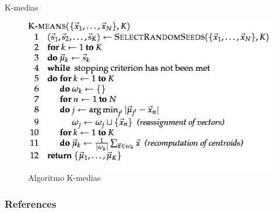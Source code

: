 \documentclass[mathserif]{beamer}
\begin{document}
\begin{frame}{K-medias}
\begin{figure}[h!]
	\centering
	\includegraphics[scale=0.6]{pics/kmeans.png}
	\caption{ Algoritmo K-medias}
\end{figure}


 



 
\end{frame}




\begin{frame}[allowframebreaks]\scriptsize
\frametitle{References}


%
\end{frame}



\end{document}
